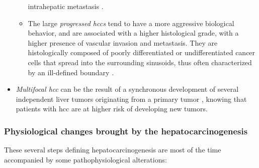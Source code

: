 \begin{itemize}
\begin{itemize}
    intrahepatic metastasis \cite{Park2011}.
  \item The large \emph{progressed \ac{hcc}s} tend to have a more aggressive
    biological behavior, and are associated with a higher histological
    grade, with a higher presence of vascular invasion and metastasis. They are histologically composed of poorly differentiated or
    undifferentiated cancer cells that spread into the surrounding
    sinusoids, thus often characterized by an ill-defined boundary \cite{Kudo2010,Beasley1981,ElSerag2011,Baffy2012,McGlynn2011,Tyson2011, Theise2006, Trevisani2008a}.
  \end{itemize}
\item \emph{Multifocal \ac{hcc}} can be the result of a synchronous development
  of several independent liver tumors originating from a primary tumor \cite{Trevisani2008a}, knowing that patients with
  \ac{hcc} are at higher risk of developing new tumors.
\end{itemize}

\subsubsection{Physiological changes brought by the hepatocarcinogenesis}

These several steps defining hepatocarcinogenesis are most of the time
accompanied by some pathophysiological alterations:


